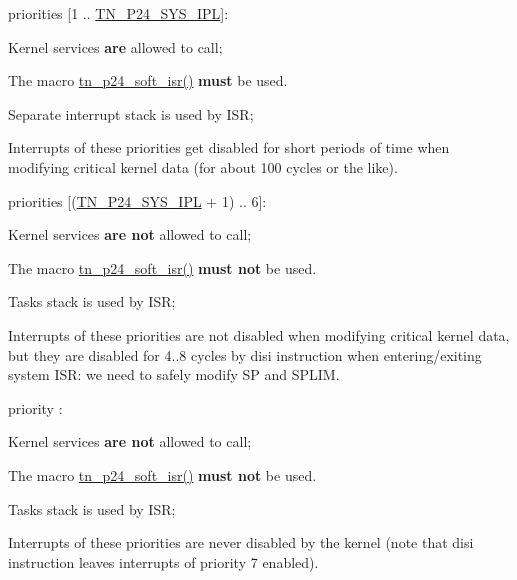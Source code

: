\begin{DoxyItemize}
\item priorities {\ttfamily \mbox{[}1 .. \hyperlink{tn__cfg__default_8h_a4feb7eb34fc2f175167b7496b63c398a}{T\+N\+\_\+\+P24\+\_\+\+S\+Y\+S\+\_\+\+I\+PL}\mbox{]}}\+:
\begin{DoxyItemize}
\item Kernel services {\bfseries are} allowed to call;
\item The macro {\ttfamily \hyperlink{tn__arch__pic24_8h_a0b184d3c15066f5504144379d2624ff3}{tn\+\_\+p24\+\_\+soft\+\_\+isr()}} {\bfseries must} be used.
\item Separate interrupt stack is used by I\+SR;
\item Interrupts of these priorities get disabled for short periods of time when modifying critical kernel data (for about 100 cycles or the like).
\end{DoxyItemize}
\item priorities {\ttfamily \mbox{[}(\hyperlink{tn__cfg__default_8h_a4feb7eb34fc2f175167b7496b63c398a}{T\+N\+\_\+\+P24\+\_\+\+S\+Y\+S\+\_\+\+I\+PL} + 1) .. 6\mbox{]}}\+:
\begin{DoxyItemize}
\item Kernel services {\bfseries are not} allowed to call;
\item The macro {\ttfamily \hyperlink{tn__arch__pic24_8h_a0b184d3c15066f5504144379d2624ff3}{tn\+\_\+p24\+\_\+soft\+\_\+isr()}} {\bfseries must not} be used.
\item Task\textquotesingle{}s stack is used by I\+SR;
\item Interrupts of these priorities are not disabled when modifying critical kernel data, but they are disabled for 4..8 cycles by {\ttfamily disi} instruction when entering/exiting system I\+SR\+: we need to safely modify {\ttfamily SP} and {\ttfamily S\+P\+L\+IM}.
\end{DoxyItemize}
\item priority {}\+:
\begin{DoxyItemize}
\item Kernel services {\bfseries are not} allowed to call;
\item The macro {\ttfamily \hyperlink{tn__arch__pic24_8h_a0b184d3c15066f5504144379d2624ff3}{tn\+\_\+p24\+\_\+soft\+\_\+isr()}} {\bfseries must not} be used.
\item Task\textquotesingle{}s stack is used by I\+SR;
\item Interrupts of these priorities are never disabled by the kernel (note that {\ttfamily disi} instruction leaves interrupts of priority 7 enabled).
\end{DoxyItemize}
\end{DoxyItemize}

